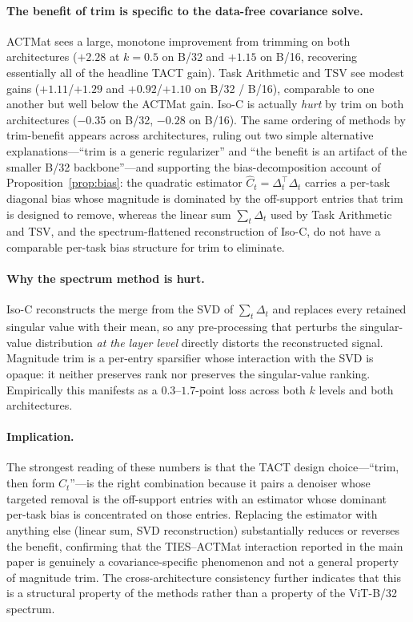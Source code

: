 \documentclass{article}
\theoremstyle{plain}
\theoremstyle{definition}
\theoremstyle{remark}
\begin{document}


\paragraph{The benefit of trim is specific to the data-free covariance solve.}
ACTMat sees a large, monotone improvement from trimming on both architectures ($+2.28$ at $k=0.5$ on B/32 and $+1.15$ on B/16, recovering essentially all of the headline TACT gain). Task Arithmetic and TSV see modest gains ($+1.11$/$+1.29$ and $+0.92$/$+1.10$ on B/32 / B/16), comparable to one another but well below the ACTMat gain. Iso-C is actually \emph{hurt} by trim on both architectures ($-0.35$ on B/32, $-0.28$ on B/16). The same ordering of methods by trim-benefit appears across architectures, ruling out two simple alternative explanations---``trim is a generic regularizer'' and ``the benefit is an artifact of the smaller B/32 backbone''---and supporting the bias-decomposition account of Proposition~\ref{prop:bias}: the quadratic estimator $\hat C_t = \Delta_t^\top \Delta_t$ carries a per-task diagonal bias whose magnitude is dominated by the off-support entries that trim is designed to remove, whereas the linear sum $\sum_t \Delta_t$ used by Task Arithmetic and TSV, and the spectrum-flattened reconstruction of Iso-C, do not have a comparable per-task bias structure for trim to eliminate.

\paragraph{Why the spectrum method is hurt.}
Iso-C reconstructs the merge from the SVD of $\sum_t \Delta_t$ and replaces every retained singular value with their mean, so any pre-processing that perturbs the singular-value distribution \emph{at the layer level} directly distorts the reconstructed signal. Magnitude trim is a per-entry sparsifier whose interaction with the SVD is opaque: it neither preserves rank nor preserves the singular-value ranking. Empirically this manifests as a $0.3$--$1.7$-point loss across both $k$ levels and both architectures.

\paragraph{Implication.}
The strongest reading of these numbers is that the TACT design choice---``trim, then form $\hat C_t$''---is the right combination because it pairs a denoiser whose targeted removal is the off-support entries with an estimator whose dominant per-task bias is concentrated on those entries. Replacing the estimator with anything else (linear sum, SVD reconstruction) substantially reduces or reverses the benefit, confirming that the TIES--ACTMat interaction reported in the main paper is genuinely a covariance-specific phenomenon and not a general property of magnitude trim. The cross-architecture consistency further indicates that this is a structural property of the methods rather than a property of the ViT-B/32 spectrum.
\end{document}
